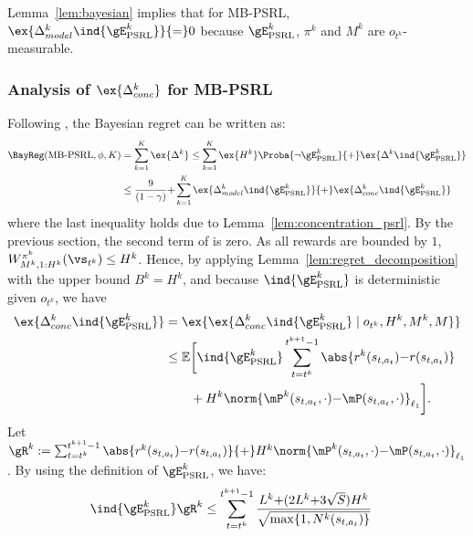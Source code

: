 \begin{subappendices}
Lemma~\ref{lem:bayesian} implies that for MB-PSRL, $\ex{\Delta_{model}^k \ind{\gE^{k}_\text{PSRL}}}{=}0$ because
$\gE^{k}_\text{PSRL}$, $\pi^k$ and $M^k$ are $o_{t^k}$-measurable. 

\subsubsection{Analysis of \texorpdfstring{$\ex{\Delta_{conc}^k}$}{} for MB-PSRL}
Following , the Bayesian regret can be written as:
\begin{align}
    \BayReg(\textnormal{MB-PSRL},\phi,K)
    &= \sum_{k=1}^K \ex{\Delta^k} \le \sum_{k=1}^{K}\ex{H^k}\Proba{\neg \gE_\text{PSRL}^{k}} {+}\ex{\Delta^k \ind{\gE_\text{PSRL}^{k}}} \nonumber \\
    &\le \frac{9}{(1-\gamma)} {+} \sum_{k=1}^{K} \ex{\Delta_{model}^k\ind{\gE_\text{PSRL}^{k}}} {+} \ex{\Delta_{conc}^k\ind{\gE_\text{PSRL}^{k}}}
    \label{eq:proof_PSRL_regret}
\end{align}
where the last inequality holds due to Lemma~\ref{lem:concentration_psrl}.
By the previous section, the second term of  is zero.
As all rewards are bounded by $1$, $W_{M^k,1:H^k}^{\pi^k}(\vs_{t^k})\le H^k$. Hence, by applying Lemma~\ref{lem:regret_decomposition} with the upper bound $B^k=H^k$, and because $\ind{\gE^{k}_\text{PSRL}}$ is deterministic given $o_{t^k}$, we have
\begin{align}
    \ex{\Delta^k_{conc} \ind{\gE^{k}_\text{PSRL}}}
    &= \ex{\ex{\Delta^k_{conc} \ind{\gE^{k}_\text{PSRL}} \mid o_{t^k}, H^k, M^k, M}} \nonumber \\
    &\le \mathbb{E}\bigg[ \ind{\gE^{k}_\text{PSRL}} \sum_{t=t^k}^{t^{k+1}-1}\abs{r^k(s_{t,a_t}){-}r(s_{t,a_t})} \nonumber\\
    &\qquad +H^k\norm{\mP^{k}(s_{t,a_t},\cdot){-}\mP(s_{t,a_t},\cdot)}_{\ell_1} \bigg]. \label{eq:conc_with_i}
\end{align}
Let $\gR^k := \sum_{t=t^k}^{t^{k+1}-1}\abs{r^k(s_{t,a_t}){-}r(s_{t,a_t})} {+}H^k\norm{\mP^{k}(s_{t,a_t},\cdot){-}\mP(s_{t,a_t},\cdot)}_{\ell_1}$. 
By using the definition of $\gE^{k}_\text{PSRL}$, we have:
\begin{align}
    \ind{\gE^{k}_\text{PSRL}}\gR^k 
    &\le \sum_{t=t^k}^{t^{k+1}-1} \frac{L^{k}{+}(2L^{k} {+}3\sqrt{S})H^k}{\sqrt{\max\{1,N^{k}(s_{t,a_t})\} }} \label{eq:PSRL_R_k}

\end{align}
\end{subappendices}
